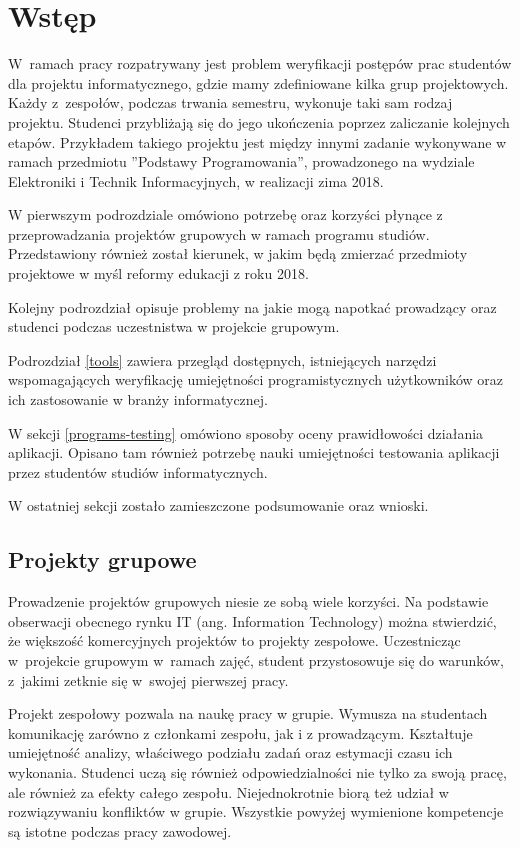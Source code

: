 \chapter{Wstęp}
\label{chapter:intro}

W~ramach pracy rozpatrywany jest problem weryfikacji postępów prac studentów dla projektu informatycznego, gdzie mamy zdefiniowane kilka grup projektowych.
Każdy z~zespołów, podczas trwania semestru, wykonuje taki sam rodzaj projektu.
Studenci przybliżają się do jego ukończenia poprzez zaliczanie kolejnych etapów.
Przykładem takiego projektu jest między innymi zadanie wykonywane w ramach przedmiotu ”Podstawy Programowania”, prowadzonego na wydziale Elektroniki i Technik Informacyjnych, w realizacji zima 2018.

W pierwszym podrozdziale omówiono potrzebę oraz korzyści płynące z przeprowadzania projektów grupowych w ramach programu studiów.
Przedstawiony również został kierunek, w jakim będą zmierzać przedmioty projektowe w myśl reformy edukacji z roku 2018.

Kolejny podrozdział opisuje problemy na jakie mogą napotkać prowadzący oraz studenci podczas uczestnistwa w projekcie grupowym.

Podrozdział \ref{tools} zawiera przegląd dostępnych, istniejących narzędzi wspomagających weryfikację umiejętności programistycznych użytkowników oraz ich zastosowanie w branży informatycznej.

W sekcji \ref{programs-testing} omówiono sposoby oceny prawidłowości działania aplikacji.
Opisano tam również potrzebę nauki umiejętności testowania aplikacji przez studentów studiów informatycznych.

W ostatniej sekcji zostało zamieszczone podsumowanie oraz wnioski.

\vfill

\section{Projekty grupowe}

Prowadzenie projektów grupowych niesie ze sobą wiele korzyści.
Na podstawie obserwacji obecnego rynku IT (ang. Information Technology) można stwierdzić, że większość komercyjnych projektów to projekty zespołowe.
Uczestnicząc w~projekcie grupowym w~ramach zajęć, student przystosowuje się do warunków, z~jakimi zetknie się w~swojej pierwszej pracy.

Projekt zespołowy pozwala na naukę pracy w grupie.
Wymusza na studentach komunikację zarówno z członkami zespołu, jak i z prowadzącym.
Kształtuje umiejętność analizy, właściwego podziału zadań oraz estymacji czasu ich wykonania.
Studenci uczą się również odpowiedzialności nie tylko za swoją pracę, ale również za efekty całego zespołu.
Niejednokrotnie biorą też udział w rozwiązywaniu konfliktów w grupie.
Wszystkie powyżej wymienione kompetencje są istotne podczas pracy zawodowej.


